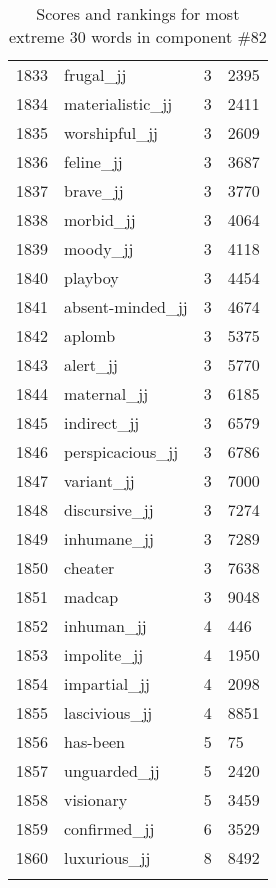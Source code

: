 \begin{longtable}[!htbp]{| rlr@{.}l |}
    1833 & frugal\_jj & 3 & 2395 \\
    1834 & materialistic\_jj & 3 & 2411 \\
    1835 & worshipful\_jj & 3 & 2609 \\
    1836 & feline\_jj & 3 & 3687 \\
    1837 & brave\_jj & 3 & 3770 \\
    1838 & morbid\_jj & 3 & 4064 \\
    1839 & moody\_jj & 3 & 4118 \\
    1840 & playboy & 3 & 4454 \\
    1841 & absent-minded\_jj & 3 & 4674 \\
    1842 & aplomb & 3 & 5375 \\
    1843 & alert\_jj & 3 & 5770 \\
    1844 & maternal\_jj & 3 & 6185 \\
    1845 & indirect\_jj & 3 & 6579 \\
    1846 & perspicacious\_jj & 3 & 6786 \\
    1847 & variant\_jj & 3 & 7000 \\
    1848 & discursive\_jj & 3 & 7274 \\
    1849 & inhumane\_jj & 3 & 7289 \\
    1850 & cheater & 3 & 7638 \\
    1851 & madcap & 3 & 9048 \\
    1852 & inhuman\_jj & 4 & 446 \\
    1853 & impolite\_jj & 4 & 1950 \\
    1854 & impartial\_jj & 4 & 2098 \\
    1855 & lascivious\_jj & 4 & 8851 \\
    1856 & has-been & 5 & 75 \\
    1857 & unguarded\_jj & 5 & 2420 \\
    1858 & visionary & 5 & 3459 \\
    1859 & confirmed\_jj & 6 & 3529 \\
    1860 & luxurious\_jj & 8 & 8492 \\
    \hline
    \caption{Scores and rankings for most extreme 30 words in component \#82} \\
\end{longtable}
